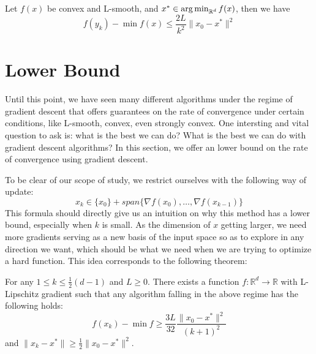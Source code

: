 \begin{theorem}
    Let $f(x)$ be convex and L-smooth, and $x^* \in \operatorname*{arg\,min}_{\mathbb{R}^d} f(x)$, then we have
    \begin{equation*}
        f(y_k) - \min f(x) \leq \frac{2L}{k^2} \| x_0 - x^* \|^2
    \end{equation*}
\end{theorem}


\section{Lower Bound}
Until this point, we have seen many different algorithms under the regime of gradient descent that offers guarantees on the rate of convergence under certain conditions, like L-smooth, convex, even strongly convex. One intersting and vital question to ask is: what is the best we can do? What is the best we can do with gradient descent algorithms? In this section, we offer an lower bound on the rate of convergence using gradient descent. 

To be clear of our scope of study, we restrict ourselves with the following way of update:
\begin{equation*}
    x_k \in \{x_0\} + span \{\nabla f(x_0), \ldots, \nabla f(x_{k-1})\}
\end{equation*}
This formula should directly give us an intuition on why this method has a lower bound, especially when $k$ is small. As the dimension of $x$ getting larger, we need more gradients serving as a new basis of the input space so as to explore in any direction we want, which should be what we need when we are trying to optimize a hard function. This idea corresponds to the following theorem:

\begin{theorem}
    For any $1 \leq k \leq \frac{1}{2} (d-1)$ and $L \geq 0$. There exists a function $f: \mathbb{R}^d \rightarrow \mathbb{R}$ with L-Lipschitz gradient such that any algorithm falling in the above regime has the following holds:
    \begin{equation*}
        f(x_k) - \min f \geq \frac{3L}{32}\frac{\| x_0 - x^* \|^2}{(k+1)^2}
    \end{equation*}
    and  $\| x_k - x^* \| \geq \frac{1}{2} \|x_0 - x^* \|^2$.
\end{theorem}